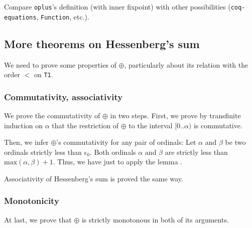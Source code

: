     \begin{project}
    Compare \texttt{oplus}'s definition (with inner fixpoint) with other possibilities
    (\texttt{coq-equations}, \texttt{Function}, etc.).
    \end{project}
    \subsection{More theorems on Hessenberg's sum}

    We need to prove some properties of $\oplus$, particularly about 
    its relation with the order $<$ on \texttt{T1}.

    \subsubsection{Commutativity, associativity}

    We prove  the commutativity of $\oplus$ in two steps. 
    First, we prove by transfinite induction on $\alpha$ that the restriction of $\oplus$ to the
    interval $[0..\alpha)$ is commutative.


    

    

    Then, we infer  $\oplus$'s commutativity for any pair of ordinals:
    Let $\alpha$ and $\beta$ be two ordinals strictly less than $\epsilon_0$. Both ordinals $\alpha$ and $\beta$ are
    strictly less than $\textrm{max}(\alpha,\beta)+1$.
        Thus, we have just to apply the lemma .


  

    Associativity of Hessenberg's sum is proved the same way.

    
    
    
    
 

    \subsubsection{Monotonicity}

    At last, we prove that $\oplus$ is strictly monotonous in both of its arguments.

    
    
